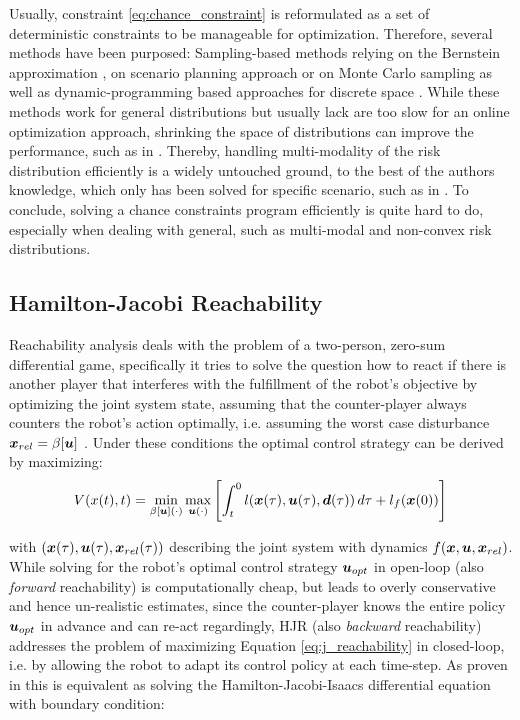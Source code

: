 Usually, constraint \ref{eq:chance_constraint} is reformulated as a set of deterministic constraints to be manageable for optimization. Therefore, several methods have been purposed: Sampling-based methods relying on the Bernstein approximation \cite{Calafiore2005}, on scenario planning approach \cite{Bemporad1999} or on Monte Carlo sampling \cite{Hong2011}\cite{Janson2015} as well as dynamic-programming based approaches for discrete space \cite{Yin-LamChow2013}\cite{Ono2015} \cite{Chow2015a}. While these methods work for general distributions but usually lack are too slow for an online optimization approach, shrinking the space of distributions can improve the performance, such as in \cite{Chen2018}\cite{Calafiore2006}\cite{Carvalho2014}\cite{Blackmore2009}\cite{Blackmore2011}. Thereby, handling multi-modality of the risk distribution efficiently is a widely untouched ground, to the best of the authors knowledge, which only has been solved for specific scenario, such as in \cite{Hu2018}. To conclude, solving a chance constraints program efficiently is quite hard to do, especially when dealing with general, such as multi-modal and  non-convex risk distributions.

\subsection{Hamilton-Jacobi Reachability} 
Reachability analysis deals with the problem of a two-person, zero-sum differential game, specifically it tries to solve the question how to react if there is another player that interferes with the fulfillment of the robot's objective by optimizing the joint system state, assuming that the counter-player always counters the robot's action optimally, i.e. assuming the worst case disturbance $\boldsymbol{x}_{rel} = \beta[\boldsymbol{u}]$ \cite{Pavone2020}. Under these conditions the optimal control strategy can be derived by maximizing: \\

\begin{equation}
V(x(t), t) = \min_{\beta[\boldsymbol{u}](\cdot)} \max_{\boldsymbol{u}(\cdot)} \left[ \int_t^0 l(\boldsymbol{x}(\tau), \boldsymbol{u}(\tau), \boldsymbol{d}(\tau)) \, d\tau + l_f(\boldsymbol{x}(0)) \right]
\label{eq:j_reachability}
\end{equation}

with $(\boldsymbol{x}(\tau), \boldsymbol{u}(\tau), \boldsymbol{x}_{rel}(\tau))$ describing the joint system with dynamics $f(\boldsymbol{x}, \boldsymbol{u}, \boldsymbol{x}_{rel})$. While solving for the robot's optimal control strategy $\boldsymbol{u}_{opt}$ in open-loop (also \textit{forward} reachability) is computationally cheap, but leads to overly conservative and hence un-realistic estimates, since the counter-player knows the entire policy $\boldsymbol{u}_{opt}$ in advance and can re-act regardingly, \ac{HJR} (also \textit{backward} reachability) addresses the problem of maximizing Equation \ref{eq:j_reachability} in closed-loop, i.e. by allowing the robot to adapt its control policy at each time-step. As proven in \cite{Pavone2020} this is equivalent as solving the Hamilton-Jacobi-Isaacs differential equation with boundary condition: \\

